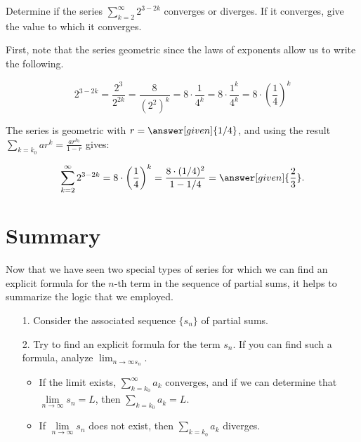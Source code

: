 \documentclass{ximera}
\begin{document}
\begin{question}
Determine if the series $\sum\limits_{k=2}^{\infty} 2^{3-2k}$ converges or diverges.  If it converges, give the value to which it converges.

\begin{explanation}
First, note that the series  geometric since the laws of exponents allow us to write the following.

\[
2^{3-2k} = \frac{2^3}{2^{2k}} = \frac{8}{\left(2^2\right)^k} =  8 \cdot \frac{1}{4^k} =  8 \cdot \frac{1^k}{4^k} =  8 \cdot \left(\frac{1}{4}\right)^k
\]

The series is geometric with $r = \answer[given]{1/4}$, and using the result $\sum\limits_{k=k_0} ar^k = \frac{ar^{k_0}}{1-r}$ gives:

\[
\sum\limits_{k=2}^{\infty} 2^{3-2k} =  8 \cdot \left(\frac{1}{4}\right)^k =  \frac{8 \cdot (1/4)^2}{1-1/4}  =  \answer[given]{\frac{2}{3}}.
\]
\end{explanation}

\end{question}    


























\section{Summary}
Now that we have seen two special types of series for which we can find an explicit formula for the $n$-th term in the sequence of partial sums, it helps to summarize the logic that we employed.

\begin{itemize}
\item[1.] Consider the associated sequence $\{s_n\}$ of partial sums.
\item[2.] Try to find an explicit formula for the term $s_n$.  If you can find such a formula, analyze $\lim_{n \to \infty s_n}$.  
\begin{itemize}
\item If the limit exists, $\sum\limits_{k=k_0}^{\infty} a_k$ converges, and if we can determine that $\lim\limits_{n \to \infty} s_n =L$, then $\sum\limits_{k=k_0} a_k=L$.  \item If  $\lim\limits_{n \to \infty} s_n$ does not exist, then $\sum\limits_{k=k_0} a_k$ diverges.
\end{itemize}
\end{itemize}
\end{document}
